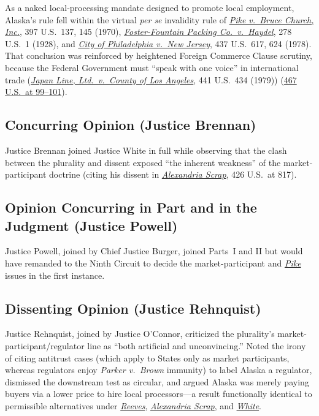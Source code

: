 \documentclass[12pt]{article}
\begin{document}
As a naked local-processing mandate designed to promote local employment, Alaska's rule fell within the virtual \textit{per se} invalidity rule of \href{https://supreme.justia.com/cases/federal/us/397/137/}{\textit{Pike v.\ Bruce Church, Inc.}}, 397 U.S.\ 137, 145 (1970), \href{https://supreme.justia.com/cases/federal/us/278/1/}{\textit{Foster-Fountain Packing Co.\ v.\ Haydel}}, 278 U.S.\ 1 (1928), and \href{https://supreme.justia.com/cases/federal/us/437/617/}{\textit{City of Philadelphia v.\ New Jersey}}, 437 U.S.\ 617, 624 (1978). That conclusion was reinforced by heightened Foreign Commerce Clause scrutiny, because the Federal Government must ``speak with one voice'' in international trade (\href{https://supreme.justia.com/cases/federal/us/441/434/}{\textit{Japan Line, Ltd.\ v.\ County of Los Angeles}}, 441 U.S.\ 434 (1979)) (\href{https://supreme.justia.com/cases/federal/us/467/82/}{467 U.S.\ at 99--101}).

\subsection{Concurring Opinion (Justice Brennan)}

Justice Brennan joined Justice White in full while observing that the clash between the plurality and dissent exposed ``the inherent weakness'' of the market-participant doctrine (citing his dissent in \href{https://supreme.justia.com/cases/federal/us/426/794/}{\textit{Alexandria Scrap}}, 426 U.S.\ at 817).

\subsection{Opinion Concurring in Part and in the Judgment (Justice Powell)}

Justice Powell, joined by Chief Justice Burger, joined Parts~I and II but would have remanded to the Ninth Circuit to decide the market-participant and \href{https://supreme.justia.com/cases/federal/us/397/137/}{\textit{Pike}} issues in the first instance.

\subsection{Dissenting Opinion (Justice Rehnquist)}

Justice Rehnquist, joined by Justice O'Connor, criticized the plurality's market-participant/regulator line as ``both artificial and unconvincing.'' Noted the irony of citing antitrust cases (which apply to States only as market participants, whereas regulators enjoy \textit{Parker v.\ Brown} immunity) to label Alaska a regulator, dismissed the downstream test as circular, and argued Alaska was merely paying buyers via a lower price to hire local processors---a result functionally identical to permissible alternatives under \href{https://supreme.justia.com/cases/federal/us/447/429/}{\textit{Reeves}}, \href{https://supreme.justia.com/cases/federal/us/426/794/}{\textit{Alexandria Scrap}}, and \href{https://supreme.justia.com/cases/federal/us/460/204/}{\textit{White}}.
\end{document}
